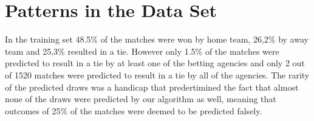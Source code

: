\documentclass[11pt]{article}
\begin{document}
\section{Patterns in the Data Set}

In the training set 48.5$\%$ of the matches were won by home team, 26,2$\%$ by away team and 25,3$\%$ resulted in a tie. However only 1.5$\%$ of the matches were predicted to result in a tie by at least one of the betting agencies and only 2 out of 1520 matches were predicted to result in a tie by all of the agencies. The rarity of the predicted draws was a handicap that predertimined the fact that almost none of the draws were predicted by our algorithm as well, meaning that outcomes of 25$\%$ of the matches were deemed to be predicted falsely.  
\end{document}
